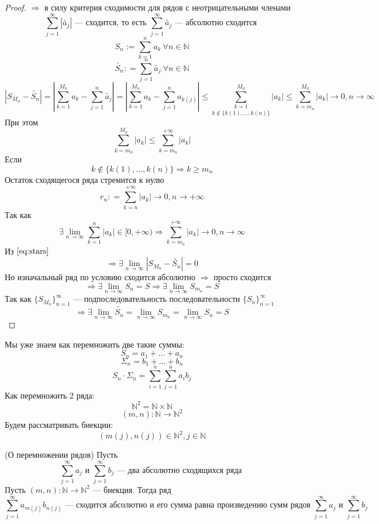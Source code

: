 \documentclass[11pt]{article}
\begin{document}
\begin{proof}
    $\Rightarrow$ в силу критерия сходимости для рядов с неотрицательными членами
    \[ \sum_{j=1}^{\infty} |\widetilde{a_j}| \text{ --- сходится, то есть } \sum_{j=1}^{\infty} \widetilde{a_j} \text{ --- абсолютно сходится } \]
    \[ S_n:= \sum_{k=1}^{n} a_k \ \forall n\in \mathbb{N} \] 
    \[ \widetilde{S_n} : = \sum_{j=1}^{n} \widetilde{a_j} \ \forall n\in \mathbb{N} \] 
    \[ \left|S_{M_n} - \widetilde{S_n}\right| = \left| \sum_{k=1}^{M_n} a_k - \sum_{j=1}^{n} \widetilde{a_j} \right| = \left| \sum_{k=1}^{M_n} a_k - \sum_{j=1}^{n} a_{k(j)} \right| \le \underset{k\notin \{k(1), ..., k(n)\}} {\sum_{k=1}^{M_n}}  |a_k| \le \sum_{k=m_n}^{M_n} |a_k| \to 0, n\to \infty \tag{**}\label{eq:stars} \] 
    При этом 
    \[  \sum_{k=m_n}^{M_n} |a_k| \le \sum_{k=m_n}^{+\infty} |a_k| \] 
    Если 
    \[ k\notin \{ k(1), ..., k(n) \} \Rightarrow k\ge m_n \] 
    Остаток сходящегося ряда стремится к нулю
    \[ r_n: = \sum_{k=n}^{+\infty} |a_k| \to 0, n\to +\infty \]
    Так как 
    \[ \exists \lim\limits_{n\to \infty} \sum_{k=1}^{n} |a_k| \in [0,+\infty)  \Rightarrow \sum_{k=m_n}^{+\infty} |a_k|\to 0, n\to \infty \]
    Из $\eqref{eq:stars}$
    \[ \Rightarrow \exists \lim\limits_{n\to \infty} \left| S_{M_n} - \widetilde{S_n} \right| = 0 \]  
    Но изначальный ряд по условию сходится абсолютно $\Rightarrow$ просто сходится 
    \[ \Rightarrow \exists \lim\limits_{n\to \infty} S_n = S \Rightarrow \exists \lim\limits_{n\to \infty} S_{m_n} = S\] 
    Так как $\{ S_{M_n}\} _{n=1} ^\infty$ --- подпоследовательность последовательности $\{S_n\} _{n=1} ^\infty$ 
    \[ \Rightarrow \exists \lim\limits_{n\to \infty} \widetilde{S_n} = \lim\limits_{n\to \infty} S_{m_n} = \lim\limits_{n\to \infty} S_n = S \]
\end{proof}


\begin{remark}
    Мы уже знаем как перемножить две такие суммы:
    \[ S_n = a_1 + ... + a_n \]
    \[ \Sigma_n = b_1 + ... + b_n \]
    \[ S_n \cdot \Sigma_n = \sum_{i=1}^{n} \sum_{j=1}^{n} a_i b_j \]
    Как перемножить 2 ряда: 
    \[ \mathbb{N}^2 = \mathbb{N} \times \mathbb{N} \]
    \[ (m,n) : \mathbb{N} \to \mathbb{N}^2 \] 
    Будем рассматривать биекции: 
    \[ (m(j), n(j)) \in \mathbb{N}^2 , j\in \mathbb{N} \]
\end{remark}


\begin{theorem}
    (О перемножении рядов) Пусть 
    \[ \sum_{j=1}^{\infty} a_j \text{ и } \sum_{j=1}^{\infty} b_j \text{ --- два абсолютно сходящихся ряда } \]
    Пусть $(m,n): \mathbb{N}\to \mathbb{N}^2$ --- биекция. Тогда ряд 
    \[ \sum_{j=1}^{\infty} a_{m(j)} b_{n(j)} \text{ --- сходится абсолютно и его сумма равна произведению сумм рядов } \sum_{j=1}^{\infty} a_j \text{ и } \sum_{j=1}^{\infty} b_j \]
\end{theorem}
\end{document}

